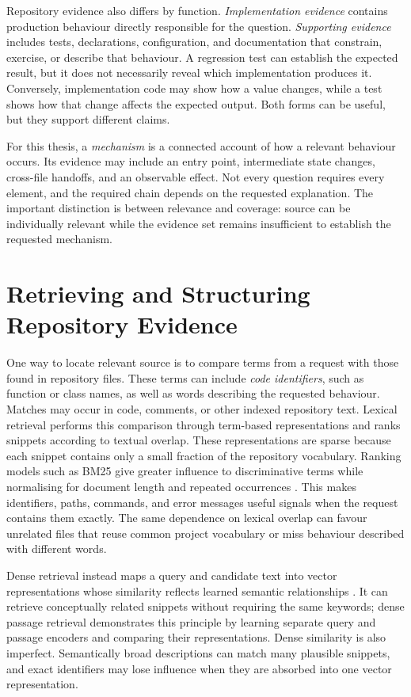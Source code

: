 Repository evidence also differs by function. \emph{Implementation evidence} contains production behaviour directly responsible for the question. \emph{Supporting evidence} includes tests, declarations, configuration, and documentation that constrain, exercise, or describe that behaviour. A regression test can establish the expected result, but it does not necessarily reveal which implementation produces it. Conversely, implementation code may show how a value changes, while a test shows how that change affects the expected output. Both forms can be useful, but they support different claims.

For this thesis, a \emph{mechanism} is a connected account of how a relevant behaviour occurs. Its evidence may include an entry point, intermediate state changes, cross-file handoffs, and an observable effect. Not every question requires every element, and the required chain depends on the requested explanation. The important distinction is between relevance and coverage: source can be individually relevant while the evidence set remains insufficient to establish the requested mechanism.

\section{Retrieving and Structuring Repository Evidence}\label{sec:retrieving-and-structuring-repository-evidence}

One way to locate relevant source is to compare terms from a request with those found in repository files. These terms can include \emph{code identifiers}, such as function or class names, as well as words describing the requested behaviour. Matches may occur in code, comments, or other indexed repository text. Lexical retrieval performs this comparison through term-based representations and ranks snippets according to textual overlap. These representations are sparse because each snippet contains only a small fraction of the repository vocabulary. Ranking models such as BM25 give greater influence to discriminative terms while normalising for document length and repeated occurrences \textcite{Robertson2009BM25}. This makes identifiers, paths, commands, and error messages useful signals when the request contains them exactly. The same dependence on lexical overlap can favour unrelated files that reuse common project vocabulary or miss behaviour described with different words.

Dense retrieval instead maps a query and candidate text into vector representations whose similarity reflects learned semantic relationships \textcite{Karpukhin2020DPR}. It can retrieve conceptually related snippets without requiring the same keywords; dense passage retrieval demonstrates this principle by learning separate query and passage encoders and comparing their representations. Dense similarity is also imperfect. Semantically broad descriptions can match many plausible snippets, and exact identifiers may lose influence when they are absorbed into one vector representation.

